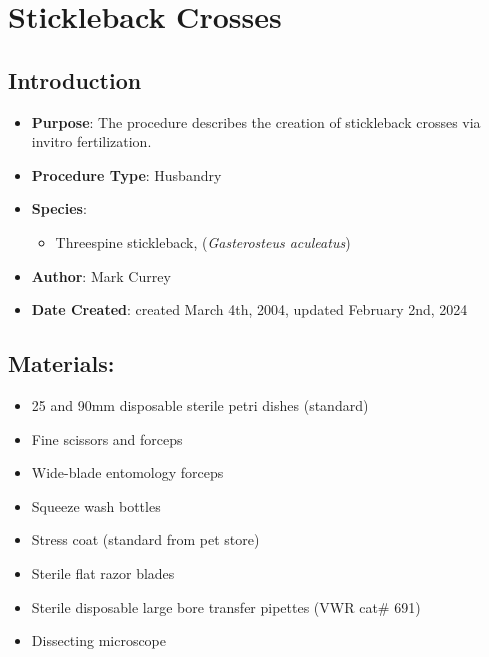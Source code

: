 \documentclass[
  letterpaper,
  DIV=11,
  numbers=noendperiod]{scrreprt}
\providecommand{\tightlist}{%
  \setlength{\itemsep}{0pt}\setlength{\parskip}{0pt}}\usepackage{longtable,booktabs,array}
\begin{document}
\hypertarget{sec-husbandry_stickleback_crossing}{%
\chapter{Stickleback Crosses}\label{sec-husbandry_stickleback_crossing}}

\hypertarget{introduction-50}{%
\section{Introduction}\label{introduction-50}}

\begin{itemize}
\tightlist
\item
  \textbf{Purpose}: The procedure describes the creation of stickleback
  crosses via invitro fertilization.
\item
  \textbf{Procedure Type}: Husbandry
\item
  \textbf{Species}:

  \begin{itemize}
  \tightlist
  \item
    Threespine stickleback, (\emph{Gasterosteus aculeatus})
  \end{itemize}
\item
  \textbf{Author}: Mark Currey
\item
  \textbf{Date Created}: created March 4th, 2004, updated February 2nd,
  2024
\end{itemize}

\hypertarget{materials-48}{%
\section{Materials:}\label{materials-48}}

\begin{itemize}
\tightlist
\item
  25 and 90mm disposable sterile petri dishes (standard)
\item
  Fine scissors and forceps
\item
  Wide-blade entomology forceps
\item
  Squeeze wash bottles
\item
  Stress coat (standard from pet store)
\item
  Sterile flat razor blades
\item
  Sterile disposable large bore transfer pipettes (VWR cat\# 691)
\item
  Dissecting microscope
\end{itemize}
\end{document}
